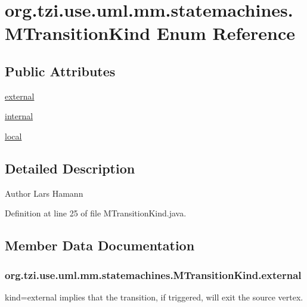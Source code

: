 \hypertarget{enumorg_1_1tzi_1_1use_1_1uml_1_1mm_1_1statemachines_1_1_m_transition_kind}{\section{org.\-tzi.\-use.\-uml.\-mm.\-statemachines.\-M\-Transition\-Kind Enum Reference}
\label{enumorg_1_1tzi_1_1use_1_1uml_1_1mm_1_1statemachines_1_1_m_transition_kind}
}
\subsection*{Public Attributes}
\begin{DoxyCompactItemize}
\item 
\hyperlink{enumorg_1_1tzi_1_1use_1_1uml_1_1mm_1_1statemachines_1_1_m_transition_kind_a348c4b00357a306a424c86e642fb0e51}{external}
\item 
\hyperlink{enumorg_1_1tzi_1_1use_1_1uml_1_1mm_1_1statemachines_1_1_m_transition_kind_adb08a4006493437022aa024ced11cb36}{internal}
\item 
\hyperlink{enumorg_1_1tzi_1_1use_1_1uml_1_1mm_1_1statemachines_1_1_m_transition_kind_a0883cda1892dc0e16cfae230e061d923}{local}
\end{DoxyCompactItemize}


\subsection{Detailed Description}
\begin{DoxyAuthor}{Author}
Lars Hamann 
\end{DoxyAuthor}


Definition at line 25 of file M\-Transition\-Kind.\-java.



\subsection{Member Data Documentation}
\hypertarget{enumorg_1_1tzi_1_1use_1_1uml_1_1mm_1_1statemachines_1_1_m_transition_kind_a348c4b00357a306a424c86e642fb0e51}{
\subsubsection[{external}]{\setlength{\rightskip}{0pt plus 5cm}org.\-tzi.\-use.\-uml.\-mm.\-statemachines.\-M\-Transition\-Kind.\-external}}\label{enumorg_1_1tzi_1_1use_1_1uml_1_1mm_1_1statemachines_1_1_m_transition_kind_a348c4b00357a306a424c86e642fb0e51}
kind=external implies that the transition, if triggered, will exit the source vertex. 

